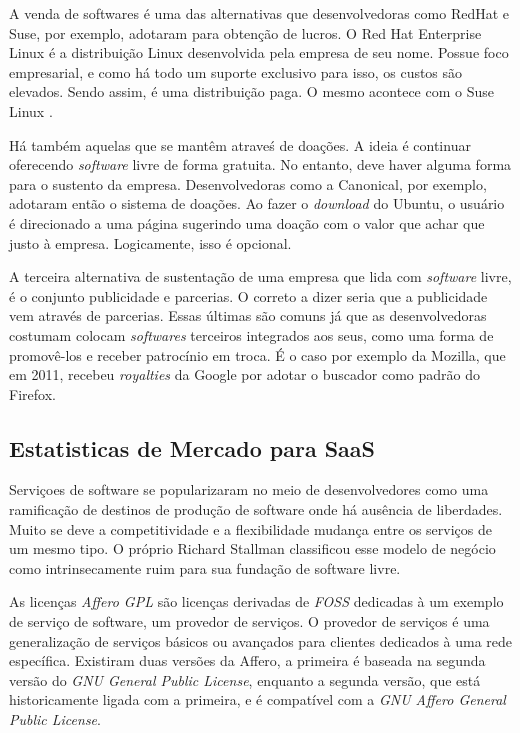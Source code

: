 \documentclass{classe_cn}                 %
\begin{document}
A venda de softwares é uma das alternativas que desenvolvedoras como RedHat e Suse, por exemplo, adotaram para obtenção de lucros. O Red Hat Enterprise Linux \cite{RHEL} é a distribuição Linux desenvolvida pela empresa de seu nome. Possue foco empresarial, e como há todo um suporte exclusivo para isso, os custos são elevados. Sendo assim, é uma distribuição paga. O mesmo acontece com o Suse Linux \cite{SUSE}.

Há também aquelas que se mantêm atraveś de doações. A ideia é continuar oferecendo \textit{software} livre de forma gratuita. No entanto, deve haver alguma forma para o sustento da empresa. Desenvolvedoras como a Canonical, por exemplo, adotaram então o sistema de doações. Ao fazer o \textit{download} do Ubuntu, o usuário é direcionado a uma página sugerindo uma doação com o valor que achar que justo à empresa. Logicamente, isso é opcional.

A terceira alternativa de sustentação de uma empresa que lida com \textit{software} livre, é o conjunto publicidade e parcerias. O correto a dizer seria que a publicidade vem através de parcerias. Essas últimas são comuns já que as desenvolvedoras costumam colocam \textit{softwares} terceiros integrados aos seus, como uma forma de promovê-los e receber patrocínio em troca. É o caso por exemplo da Mozilla, que em 2011, recebeu \textit{royalties} \cite{Google} da Google por adotar o buscador como padrão do Firefox.

\subsection{Estatisticas de Mercado para SaaS}

Serviçoes de software se popularizaram no meio de desenvolvedores como uma ramificação de destinos de produção de software onde há ausência de liberdades. Muito se deve a competitividade e a flexibilidade mudança entre os serviços de um mesmo tipo. O próprio Richard Stallman classificou esse modelo de negócio como intrinsecamente ruim para sua fundação de software livre. 

As licenças \textit{Affero GPL} são licenças derivadas de \textit{FOSS} dedicadas à um exemplo de serviço de software, um provedor de serviços. O provedor de serviços é uma generalização de serviços básicos ou avançados para clientes dedicados à uma rede específica. Existiram duas versões da Affero, a primeira é baseada na segunda versão do \textit{GNU General Public License}, enquanto a segunda versão, que está historicamente ligada com a primeira, e é compatível com a \textit{GNU Affero General Public License}.
\end{document}
